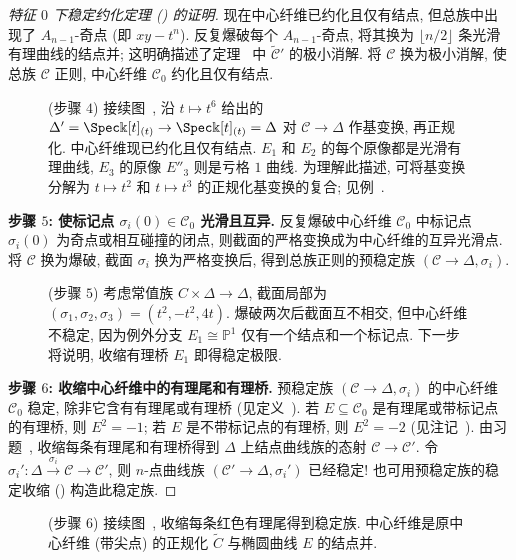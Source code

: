 \begin{proof}[特征 $0$ 下稳定约化定理 () 的证明]
现在中心纤维已约化且仅有结点, 但总族中出现了 $A_{n-1}$-奇点 (即 $xy-t^n$). 反复爆破每个 $A_{n-1}$-奇点, 将其换为 $\lfloor n/2\rfloor$ 条光滑有理曲线的结点并; 这明确描述了定理~ 中 $\widetilde{\mathcal C}'$ 的极小消解. 将 $\mathcal C$ 换为极小消解, 使总族 $\mathcal C$ 正则, 中心纤维 $\mathcal C_0$ 约化且仅有结点.
\begin{figure}[H]\centering
\caption{(步骤 $4$) 接续图~, 沿 $t\mapsto t^6$ 给出的 $\Delta'=\Spec\Bbbk[t]_{(t)}\to\Spec\Bbbk[t]_{(t)}=\Delta$ 对 $\mathcal C\to\Delta$ 作基变换, 再正规化. 中心纤维现已约化且仅有结点. $E_1$ 和 $E_2$ 的每个原像都是光滑有理曲线, $E_3$ 的原像 $E''_3$ 则是亏格 $1$ 曲线. 为理解此描述, 可将基变换分解为 $t\mapsto t^2$ 和 $t\mapsto t^3$ 的正规化基变换的复合; 见例~.}\label{src:6.5.6}
\end{figure}
\textbf{步骤 $5$: 使标记点 $\sigma_i(0)\in\mathcal C_0$ 光滑且互异.}
反复爆破中心纤维 $\mathcal C_0$ 中标记点 $\sigma_i(0)$ 为奇点或相互碰撞的闭点, 则截面的严格变换成为中心纤维的互异光滑点. 将 $\mathcal C$ 换为爆破, 截面 $\sigma_i$ 换为严格变换后, 得到总族正则的预稳定族 $(\mathcal C\to\Delta,\allowbreak \sigma_i)$.
\begin{figure}[H]\centering
\caption{(步骤 $5$) 考虑常值族 $C\times\Delta\to\Delta$, 截面局部为 $(\sigma_1,\allowbreak \sigma_2,\allowbreak \sigma_3)=(t^2,\allowbreak -t^2,\allowbreak 4t)$. 爆破两次后截面互不相交, 但中心纤维不稳定, 因为例外分支 $E_1\cong\mathbb P^1$ 仅有一个结点和一个标记点. 下一步将说明, 收缩有理桥 $E_1$ 即得稳定极限.}\label{src:6.5.7}
\end{figure}
\textbf{步骤 $6$: 收缩中心纤维中的有理尾和有理桥.}
预稳定族 $(\mathcal C\to\Delta,\allowbreak \sigma_i)$ 的中心纤维 $\mathcal C_0$ 稳定, 除非它含有有理尾或有理桥 (见定义~). 若 $E\subseteq\mathcal C_0$ 是有理尾或带标记点的有理桥, 则 $E^2=-1$; 若 $E$ 是不带标记点的有理桥, 则 $E^2=-2$ (见注记~). 由习题~, 收缩每条有理尾和有理桥得到 $\Delta$ 上结点曲线族的态射 $\mathcal C\to\mathcal C'$. 令 $\sigma_i':\Delta\xrightarrow{\sigma_i}\mathcal C\to\mathcal C'$, 则 $n$-点曲线族 $(\mathcal C'\to\Delta,\allowbreak \sigma_i')$ 已经稳定! 也可用预稳定族的稳定收缩 () 构造此稳定族.
\end{proof}
\begin{figure}[H]\centering
\caption{(步骤 $6$) 接续图~, 收缩每条红色有理尾得到稳定族. 中心纤维是原中心纤维 (带尖点) 的正规化 $\widetilde C$ 与椭圆曲线 $E$ 的结点并.}\label{src:6.5.8}
\end{figure}
